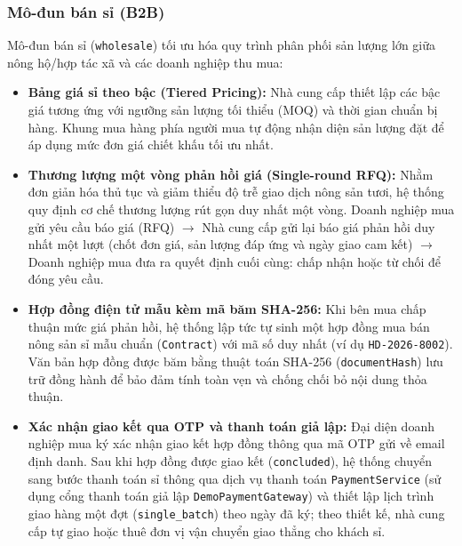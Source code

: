 \subsubsection*{Mô-đun bán sỉ (B2B)}
Mô-đun bán sỉ (\texttt{wholesale}) tối ưu hóa quy trình phân phối sản lượng lớn giữa nông hộ/hợp tác xã và các doanh nghiệp thu mua:
\begin{itemize}
    \item \textbf{Bảng giá sỉ theo bậc (Tiered Pricing):} Nhà cung cấp thiết lập các bậc giá tương ứng với ngưỡng sản lượng tối thiểu (MOQ) và thời gian chuẩn bị hàng. Khung mua hàng phía người mua tự động nhận diện sản lượng đặt để áp dụng mức đơn giá chiết khấu tối ưu nhất.
    \item \textbf{Thương lượng một vòng phản hồi giá (Single-round RFQ):} Nhằm đơn giản hóa thủ tục và giảm thiểu độ trễ giao dịch nông sản tươi, hệ thống quy định cơ chế thương lượng rút gọn duy nhất một vòng. Doanh nghiệp mua gửi yêu cầu báo giá (RFQ) $\rightarrow$ Nhà cung cấp gửi lại báo giá phản hồi duy nhất một lượt (chốt đơn giá, sản lượng đáp ứng và ngày giao cam kết) $\rightarrow$ Doanh nghiệp mua đưa ra quyết định cuối cùng: chấp nhận hoặc từ chối để đóng yêu cầu.
    \item \textbf{Hợp đồng điện tử mẫu kèm mã băm SHA-256:} Khi bên mua chấp thuận mức giá phản hồi, hệ thống lập tức tự sinh một hợp đồng mua bán nông sản sỉ mẫu chuẩn (\texttt{Contract}) với mã số duy nhất (ví dụ \texttt{HD-2026-8002}). Văn bản hợp đồng được băm bằng thuật toán SHA-256 (\texttt{documentHash}) lưu trữ đồng hành để bảo đảm tính toàn vẹn và chống chối bỏ nội dung thỏa thuận.
    \item \textbf{Xác nhận giao kết qua OTP và thanh toán giả lập:} Đại diện doanh nghiệp mua ký xác nhận giao kết hợp đồng thông qua mã OTP gửi về email định danh. Sau khi hợp đồng được giao kết (\texttt{concluded}), hệ thống chuyển sang bước thanh toán sỉ thông qua dịch vụ thanh toán \texttt{PaymentService} (sử dụng cổng thanh toán giả lập \texttt{DemoPaymentGateway}) và thiết lập lịch trình giao hàng một đợt (\texttt{single\_batch}) theo ngày đã ký; theo thiết kế, nhà cung cấp tự giao hoặc thuê đơn vị vận chuyển giao thẳng cho khách sỉ.
\end{itemize}

